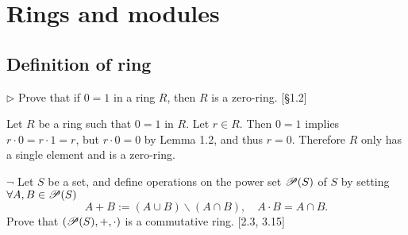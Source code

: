 \section{Rings and modules}
\setcounter{subsection}{0}

\subsection{Definition of ring}

\begin{problem}
	$\triangleright$ Prove that if $0 = 1$ in a ring $R$, then $R$ is a zero-ring. [\S 1.2]
\end{problem}

\begin{solution}
	Let $R$ be a ring such that $0 = 1$ in $R$. Let $r \in R$. Then $0 = 1$ implies $r \cdot 0 = r \cdot 1 = r$, but $r \cdot 0 = 0$ by Lemma 1.2, and thus $r = 0$. Therefore $R$ only has a single element and is a zero-ring. 
\end{solution}

\begin{problem}
	$\neg$ Let $S$ be a set, and define operations on the power set $\mathscr{P}(S)$ of $S$ by setting $\forall A, B \in \mathscr{P}(S)$
	\[
		A + B := (A \cup B) \smallsetminus (A \cap B),\quad A \cdot B = A \cap B \text{.}
	\]
	Prove that $(\mathscr{P}(S), +, \cdot)$ is a commutative ring. [2.3, 3.15]
\end{problem}

